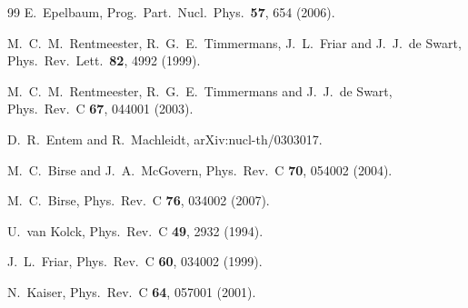 \documentclass[aps,rmp,nofootinbib,twocolumn,floatfix]{revtex4}
\begin{document}
\begin{thebibliography}{99}
  E.~Epelbaum,
  Prog.\ Part.\ Nucl.\ Phys.\  {\bf 57}, 654 (2006).


  M.~C.~M.~Rentmeester, R.~G.~E.~Timmermans, J.~L.~Friar and J.~J.~de Swart,
  Phys.\ Rev.\ Lett.\  {\bf 82}, 4992 (1999).

  M.~C.~M.~Rentmeester, R.~G.~E.~Timmermans and J.~J.~de Swart,
  Phys.\ Rev.\  C {\bf 67}, 044001 (2003).

  D.~R.~Entem and R.~Machleidt,
  arXiv:nucl-th/0303017.

  M.~C.~Birse and J.~A.~McGovern,
  Phys.\ Rev.\  C {\bf 70}, 054002 (2004).

  M.~C.~Birse,
  Phys.\ Rev.\  C {\bf 76}, 034002 (2007).

  U.~van Kolck,
  Phys.\ Rev.\  C {\bf 49}, 2932 (1994).

  J.~L.~Friar,
  Phys.\ Rev.\  C {\bf 60}, 034002 (1999).


  N.~Kaiser,
  Phys.\ Rev.\  C {\bf 64}, 057001 (2001).


\end{thebibliography}
\end{document}
